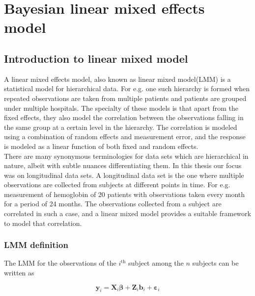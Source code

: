 
\chapter{Bayesian linear mixed effects model}
\label{ch : blmm}

\section{Introduction to linear mixed model}
\label{sec : lmm}
A linear mixed effects model, also known as linear mixed model(LMM) is a statistical model for hierarchical data. For e.g. one such hierarchy is formed when repeated observations are taken from multiple patients and patients are grouped under multiple hospitals. The specialty of these models is that apart from the fixed effects, they also model the correlation between the observations falling in the same group at a certain level in the hierarchy. The correlation is modeled using a combination of random effects and measurement error, and the response is modeled as a linear function of both fixed and random effects.\\

There are many synonymous terminologies for data sets which are hierarchical in nature, albeit with subtle nuances differentiating them. In this thesis our focus was on longitudinal data sets. A longitudinal data set is the one where multiple observations are collected from subjects at different points in time. For e.g. measurement of hemoglobin of 20 patients with observations taken every month for a period of 24 months. The observations collected from a subject are correlated in such a case, and a linear mixed model provides a suitable framework to model that correlation.

\subsection{LMM definition}
\label{subsec : lmm_definition}
The LMM for the observations of the $i^\text{th}$ subject among the $n$ subjects can be written as

\begin{equation}
\label{eq : lmm_definition}
\boldsymbol{y}_i = \boldsymbol{X}_{i}\boldsymbol{\beta} + \boldsymbol{Z}_{i}\boldsymbol{b}_{i} + \boldsymbol{\varepsilon}_{i}
\end{equation}


